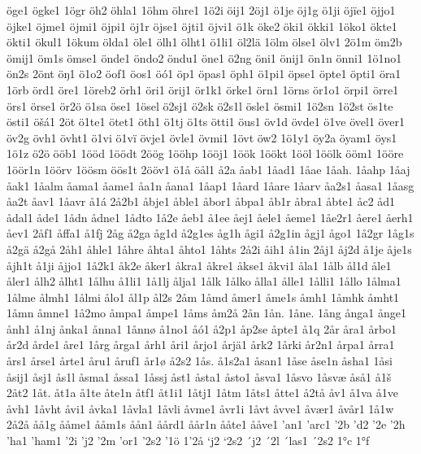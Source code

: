 öge1
ögke1
1ögr
öh2
öhla1
1öhm
öhre1
1ö2i
öij1
2öj1
ö1je
öj1g
ö1ji
öjïe1
öjjo1
öjke1
öjme1
öjmi1
öjpi1
öj1r
öjse1
öjti1
öjvi1
ö1k
öke2
öki1
ökki1
1öko1
ökte1
ökti1
ökul1
1ökum
ölda1
öle1
ölh1
ölht1
ö1li1
öl2lä
1ölm
ölse1
ölv1
2ö1m
öm2b
ömij1
öm1s
ömse1
önde1
öndo2
öndu1
öne1
ö2ng
öni1
önij1
ön1n
önni1
1ö1no1
ön2s
2önt
öŋ1
ö1o2
öof1
öos1
öó1
öp1
öpas1
öph1
ö1pi1
öpse1
öpte1
öpti1
öra1
1örb
örd1
öre1
1öreb2
örh1
öri1
örij1
ör1k1
örke1
örn1
1örns
ör1o1
örpi1
örre1
örs1
örse1
ör2ö
ö1sa
öse1
1ösel
ö2sj1
ö2sk
ö2s1l
ösle1
ösmi1
1ö2sn
1ö2st
ös1te
östi1
öšá1
2öt
ö1te1
ötet1
öth1
ö1tj
ö1ts
ötti1
öus1
öv1d
övde1
ö1ve
övel1
över1
öv2g
övh1
övht1
ö1vi
ö1vï
övje1
övle1
övmi1
1övt
öw2
1ö1y1
öy2a
öyam1
öys1
1ö1z
ö2ö
ööb1
1ööd
1öödt
2öög
1ööhp
1ööj1
1öök
1öökt
1ööl
1öölk
ööm1
1ööre
1öör1n
1öörv
1öösm
öös1t
2ööv1
ö1å
öål1
å2a
åab1
1åad1
1åae
1åah.
1åahp
1åaj
åak1
1åalm
åama1
åame1
åa1n
åana1
1åap1
1åard
1åare
1åarv
åa2s1
åasa1
1åasg
åa2t
åav1
1åavr
å1á
2å2b1
åbje1
åble1
åbor1
åbpa1
åb1r
åbra1
åbte1
åc2
åd1
ådal1
åde1
1ådn
ådne1
1ådto
1å2e
åeb1
å1ee
åej1
åele1
åeme1
1åe2r1
åere1
åerh1
åev1
2åf1
åffa1
å1fj
2åg
å2ga
åg1d
å2g1es
åg1h
ågi1
å2g1in
ågj1
ågo1
1å2gr
1åg1s
å2gä
å2gå
2åh1
åhle1
1åhre
åhta1
åhto1
1åhts
2å2i
åih1
å1in
2åj1
åj2d
å1je
åje1s
åjh1t
å1ji
åjjo1
1å2k1
åk2e
åker1
åkra1
åkre1
åkse1
åkvi1
åla1
1ålb
ål1d
åle1
åler1
ålh2
ålht1
1ålhu
å1li1
1å1lj
ålja1
1ålk
1ålko
ålla1
ålle1
1ålli1
1ållo
1ålma1
1ålme
ålmh1
1ålmi
ålo1
ål1p
ål2s
2åm
1åmd
åmer1
åme1s
åmh1
1åmhk
åmht1
1åmn
åmne1
1å2mo
åmpa1
åmpe1
1åms
åm2å
2ån
1ån.
1åne.
1ång
ånga1
ånge1
ånh1
å1nj
ånka1
ånna1
1ånnø
å1no1
åó1
å2p1
åp2se
åpte1
å1q
2år
åra1
årbo1
år2d
årde1
åre1
1årg
årga1
årh1
åri1
årjo1
årjä1
årk2
1årki
år2n1
årpa1
årra1
års1
årse1
årte1
åru1
åruf1
år1ø
å2s2
1ås.
å1s2a1
åsan1
1åse
åse1n
åsha1
1åsi
åsij1
åsj1
ås1l
åsma1
åssa1
1åssj
åst1
åsta1
åsto1
åsva1
1åsvo
1åsvæ
åså1
å1š
2åt2
1åt.
åt1a
å1te
åte1n
åtf1
åt1i1
1åtj1
1åtm
1åts1
åtte1
å2tå
åv1
å1va
å1ve
åvh1
1åvht
åvi1
åvka1
1åvla1
1åvli
åvme1
åvr1i
1åvt
åvve1
åvær1
åvår1
1å1w
2å2å
åå1g
ååme1
ååm1s
åån1
åård1
åår1n
ååte1
ååve1
'an1
'arc1
'2b
'd2
'2e
'2h
'ha1
'ham1
'2i
'j2
'2m
'or1
'2s2
'1ö
1'2å
`j2
`2s2
´j2
´2l
´las1
´2s2
1°c
1°f
